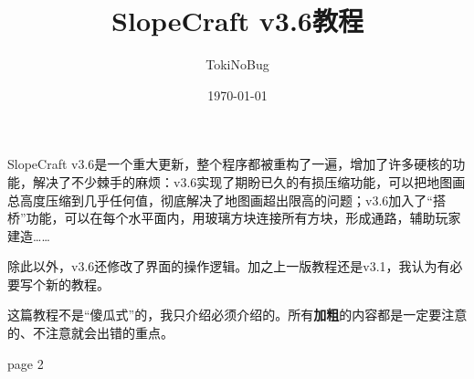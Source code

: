 \documentclass[UTF8]{ctexart}
\title{SlopeCraft v3.6教程}
\author{TokiNoBug}
\date{\today}
\begin{document}
    \maketitle
    SlopeCraft v3.6是一个重大更新，整个程序都被重构了一遍，增加了许多硬核的功能，解决了不少棘手的麻烦：v3.6实现了期盼已久的有损压缩功能，可以把地图画总高度压缩到几乎任何值，彻底解决了地图画超出限高的问题；v3.6加入了“搭桥”功能，可以在每个水平面内，用玻璃方块连接所有方块，形成通路，辅助玩家建造……
    
    除此以外，v3.6还修改了界面的操作逻辑。加之上一版教程还是v3.1，我认为有必要写个新的教程。

    这篇教程不是“傻瓜式”的，我只介绍必须介绍的。所有\textbf{加粗}的内容都是一定要注意的、不注意就会出错的重点。

    \pagebreak
    page 2
\end{document}
